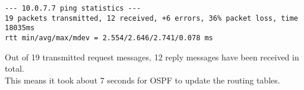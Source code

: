 \begin{lstlisting}
--- 10.0.7.7 ping statistics ---
19 packets transmitted, 12 received, +6 errors, 36% packet loss, time 18035ms
rtt min/avg/max/mdev = 2.554/2.646/2.741/0.078 ms
\end{lstlisting}

Out of 19 transmitted request messages, 12 reply messages have been received in total.  \\
This means it took about 7 seconds for OSPF to update the routing tables.
